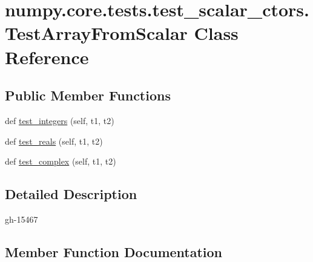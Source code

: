 \hypertarget{classnumpy_1_1core_1_1tests_1_1test__scalar__ctors_1_1TestArrayFromScalar}{}\section{numpy.\+core.\+tests.\+test\+\_\+scalar\+\_\+ctors.\+Test\+Array\+From\+Scalar Class Reference}
\label{classnumpy_1_1core_1_1tests_1_1test__scalar__ctors_1_1TestArrayFromScalar}
\subsection*{Public Member Functions}
\begin{DoxyCompactItemize}
\item 
def \hyperlink{classnumpy_1_1core_1_1tests_1_1test__scalar__ctors_1_1TestArrayFromScalar_ae9752abf0ad566627b88877090df9a6e}{test\+\_\+integers} (self, t1, t2)
\item 
def \hyperlink{classnumpy_1_1core_1_1tests_1_1test__scalar__ctors_1_1TestArrayFromScalar_abb3922cfc3b2289eee7e802dff5d0522}{test\+\_\+reals} (self, t1, t2)
\item 
def \hyperlink{classnumpy_1_1core_1_1tests_1_1test__scalar__ctors_1_1TestArrayFromScalar_a9710dbaeedcb6b6c6ed311fa02399233}{test\+\_\+complex} (self, t1, t2)
\end{DoxyCompactItemize}


\subsection{Detailed Description}
\begin{DoxyVerb}gh-15467 \end{DoxyVerb}
 

\subsection{Member Function Documentation}
\mbox{\label{classnumpy_1_1core_1_1tests_1_1test__scalar__ctors_1_1TestArrayFromScalar_a9710dbaeedcb6b6c6ed311fa02399233}} 
